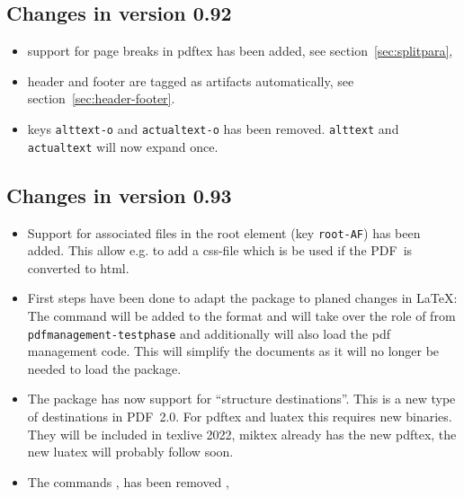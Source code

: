 \documentclass[DIV=12,parskip=half-,bibliography=totoc,a4paper]{article}
\newcommand\pkg[1]{\texttt{#1}}
\newcommand\PDF{PDF}
\begin{document}
\subsection{Changes in version 0.92}

\begin{itemize}
\item support for page breaks in pdftex has been added, see  section~\ref{sec:splitpara},


\item header and footer are tagged as artifacts automatically, see section~\ref{sec:header-footer}.

\item keys \texttt{alttext-o} and \texttt{actualtext-o} has been removed. \texttt{alttext} and \texttt{actualtext}
will now expand once.

\end{itemize}




\subsection{Changes in version 0.93}

\begin{itemize}
\item Support for associated files in the root element (key \texttt{root-AF})
has been added. This allow e.g. to add a css-file which is be used if the \PDF\ is converted to
html.

\item First steps have been done to adapt the package to planed changes in \LaTeX{}:
The command  will be
added to the format and will take over the role of 
from \pkg{pdfmanagement-testphase} and additionally
will also load the pdf management code. This will simplify the documents
as it will no longer be needed to load the package.

\item The package has now support for \enquote{structure destinations}.
This is a new type of destinations in \PDF~2.0.
For pdftex and luatex this requires new binaries. They will be included
in texlive 2022, miktex already has the new pdftex, the new luatex will probably follow soon.

\item The commands ,  has been removed ,

\end{itemize}
\end{document}
